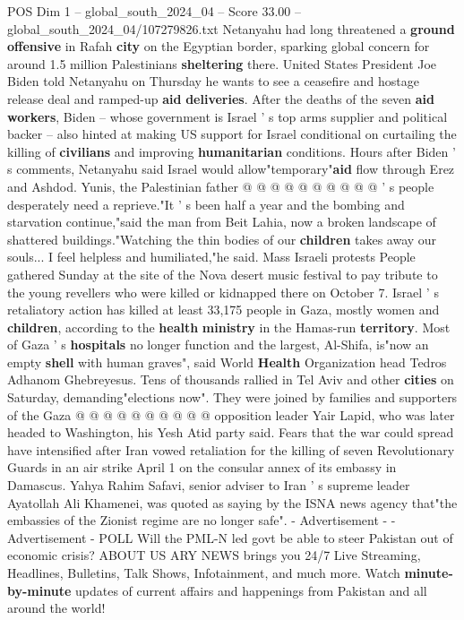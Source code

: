 \begin{textsample}{POS Dim 1 – global\_south\_2024\_04 – Score 33.00 – global\_south\_2024\_04/107279826.txt}
Netanyahu had long threatened a \textbf{ground} \textbf{offensive} in Rafah \textbf{city} on the Egyptian border, sparking global concern for around 1.5 million Palestinians \textbf{sheltering} there.
United States President Joe Biden told Netanyahu on Thursday he wants to see a ceasefire and hostage release deal and ramped-up \textbf{aid} \textbf{deliveries}.
After the deaths of the seven \textbf{aid} \textbf{workers}, Biden -- whose government is Israel ' s top arms supplier and political backer -- also hinted at making US support for Israel conditional on curtailing the killing of \textbf{civilians} and improving \textbf{humanitarian} conditions.
Hours after Biden ' s comments, Netanyahu said Israel would allow"temporary"\textbf{aid} flow through Erez and Ashdod.
Yunis, the Palestinian father @ @ @ @ @ @ @ @ @ @ ' s people desperately need a reprieve."It ' s been half a year and the bombing and starvation continue,"said the man from Beit Lahia, now a broken landscape of shattered buildings."Watching the thin bodies of our \textbf{children} takes away our souls...
I feel helpless and humiliated,"he said.
Mass Israeli protests People gathered Sunday at the site of the Nova desert music festival to pay tribute to the young revellers who were killed or kidnapped there on October 7.
Israel ' s retaliatory action has killed at least 33,175 people in Gaza, mostly women and \textbf{children}, according to the \textbf{health} \textbf{ministry} in the Hamas-run \textbf{territory}.
Most of Gaza ' s \textbf{hospitals} no longer function and the largest, Al-Shifa, is"now an empty \textbf{shell} with human graves", said World \textbf{Health} Organization head Tedros Adhanom Ghebreyesus.
Tens of thousands rallied in Tel Aviv and other \textbf{cities} on Saturday, demanding"elections now".
They were joined by families and supporters of the Gaza @ @ @ @ @ @ @ @ @ @ opposition leader Yair Lapid, who was later headed to Washington, his Yesh Atid party said.
Fears that the war could spread have intensified after Iran vowed retaliation for the killing of seven Revolutionary Guards in an air strike April 1 on the consular annex of its embassy in Damascus.
Yahya Rahim Safavi, senior adviser to Iran ' s supreme leader Ayatollah Ali Khamenei, was quoted as saying by the ISNA news agency that"the embassies of the Zionist regime are no longer safe". - Advertisement - - Advertisement - POLL Will the PML-N led govt be able to steer Pakistan out of economic crisis?
ABOUT US ARY NEWS brings you 24/7 Live Streaming, Headlines, Bulletins, Talk Shows, Infotainment, and much more.
Watch \textbf{minute-by-minute} updates of current affairs and happenings from Pakistan and all around the world!

\end{textsample}
